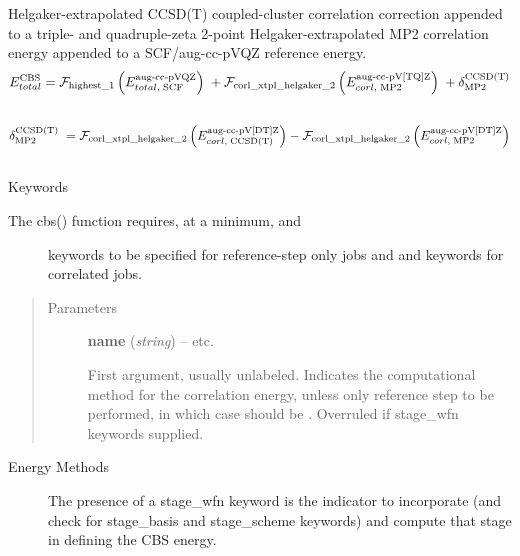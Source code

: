 \documentclass[letterpaper,10pt,english]{sphinxmanual}
\begin{document}
\begin{fulllineitems}
Helgaker-extrapolated CCSD(T) coupled-cluster correlation correction
appended to a triple- and quadruple-zeta 2-point
Helgaker-extrapolated MP2 correlation energy appended to a SCF/aug-cc-pVQZ
reference energy.
\begin{gather}
\begin{split}E_{total}^{\text{CBS}} = \mathcal{F}_{\text{highest\_1}} \left(E_{total,\; \text{SCF}}^{\text{aug-cc-pVQZ}}\right) \; + \mathcal{F}_{\text{corl\_xtpl\_helgaker\_2}} \left(E_{corl,\; \text{MP2}}^{\text{aug-cc-pV[TQ]Z}}\right) \; + \delta_{\text{MP2}}^{\text{CCSD(T)}}\end{split}\notag\\\begin{split}\end{split}\notag
\end{gather}\begin{gather}
\begin{split}\delta_{\text{MP2}}^{\text{CCSD(T)}} \; = \mathcal{F}_{\text{corl\_xtpl\_helgaker\_2}} \left(E_{corl,\; \text{CCSD(T)}}^{\text{aug-cc-pV[DT]Z}}\right) - \mathcal{F}_{\text{corl\_xtpl\_helgaker\_2}} \left(E_{corl,\; \text{MP2}}^{\text{aug-cc-pV[DT]Z}}\right)\end{split}\notag\\\begin{split}\end{split}\notag
\end{gather}
Keywords
\begin{description}
\item[{The cbs() function requires, at a minimum,  and }] \leavevmode
keywords to be specified for reference-step only jobs and  and
 keywords for correlated jobs.

\end{description}
\begin{quote}\begin{description}
\item[{Parameters}] \leavevmode
\textbf{name} (\emph{string}) -- 
 \textbar{}\textbar{}  \textbar{}\textbar{} etc.

First argument, usually unlabeled. Indicates the computational method 
for the correlation energy, unless only reference step to be performed,
in which case should be . Overruled if stage\_wfn keywords supplied.


\end{description}\end{quote}
\begin{description}
\item[{Energy Methods}] \leavevmode
The presence of a stage\_wfn keyword is the indicator to incorporate
(and check for stage\_basis and stage\_scheme keywords) and compute
that stage in defining the CBS energy.


\end{description}
\end{fulllineitems}
\end{document}
